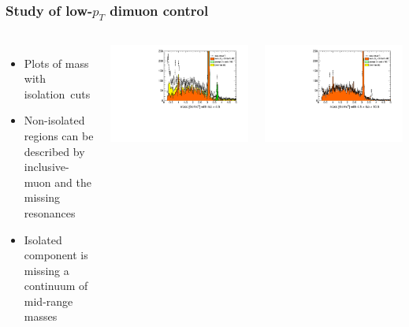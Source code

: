 \documentclass[compress]{beamer}
\begin{document}
\begin{frame}
\frametitle{Study of low-$p_T$ dimuon control}

\begin{columns}
\begin{itemize}
\item Plots of mass with \mbox{isolation cuts\hspace{-1 cm}}
\item Non-isolated regions can be described by inclusive-muon and the missing resonances
\item Isolated component is missing a continuum of mid-range masses
\end{itemize}

\includegraphics[width=1.2\linewidth]{lowdimuon_mass_isolated.pdf}

\includegraphics[width=\linewidth]{lowdimuon_mass_isosideband.pdf}


\end{columns}
\end{frame}
\end{document}
